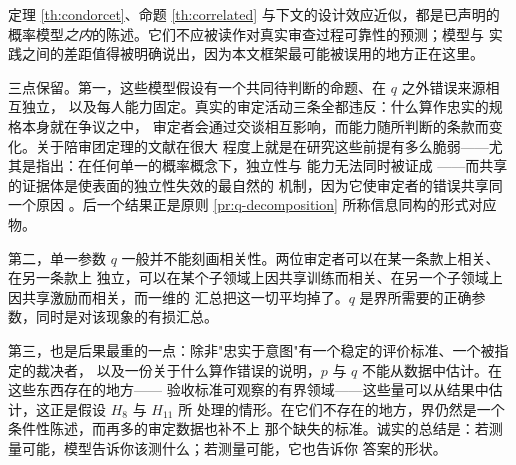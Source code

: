 \begin{remark}\label{rmk:consensus-status}
定理 \ref{th:condorcet}、命题 \ref{th:correlated} 与下文的设计效应近似，都是已声明的
概率模型\emph{之内}的陈述。它们不应被读作对真实审查过程可靠性的预测；模型与
实践之间的差距值得被明确说出，因为本文框架最可能被误用的地方正在这里。

三点保留。第一，这些模型假设有一个共同待判断的命题、在 $q$ 之外错误来源相互独立，
以及每人能力固定。真实的审定活动三条全都违反：什么算作忠实的规格本身就在争议之中，
审定者会通过交谈相互影响，而能力随所判断的条款而变化。关于陪审团定理的文献在很大
程度上就是在研究这些前提有多么脆弱——尤其是指出：在任何单一的概率概念下，独立性与
能力无法同时被证成 \cite{dietrich2008}——而共享的证据体是使表面的独立性失效的最自然的
机制，因为它使审定者的错误共享同一个原因 \cite{dietrich2004}。后一个结果正是原则
\ref{pr:q-decomposition} 所称信息同构的形式对应物。

第二，单一参数 $q$ 一般并不能刻画相关性。两位审定者可以在某一条款上相关、在另一条款上
独立，可以在某个子领域上因共享训练而相关、在另一个子领域上因共享激励而相关，而一维的
汇总把这一切平均掉了。$q$ 是界所需要的正确参数，同时是对该现象的有损汇总。

第三，也是后果最重的一点：除非"忠实于意图"有一个稳定的评价标准、一个被指定的裁决者，
以及一份关于什么算作错误的说明，$p$ 与 $q$ 不能从数据中估计。在这些东西存在的地方——
验收标准可观察的有界领域——这些量可以从结果中估计，这正是假设 $H_8$ 与 $H_{11}$ 所
处理的情形。在它们不存在的地方，界仍然是一个条件性陈述，而再多的审定数据也补不上
那个缺失的标准。诚实的总结是：若测量可能，模型告诉你该测什么；若测量可能，它也告诉你
答案的形状。
\end{remark}

